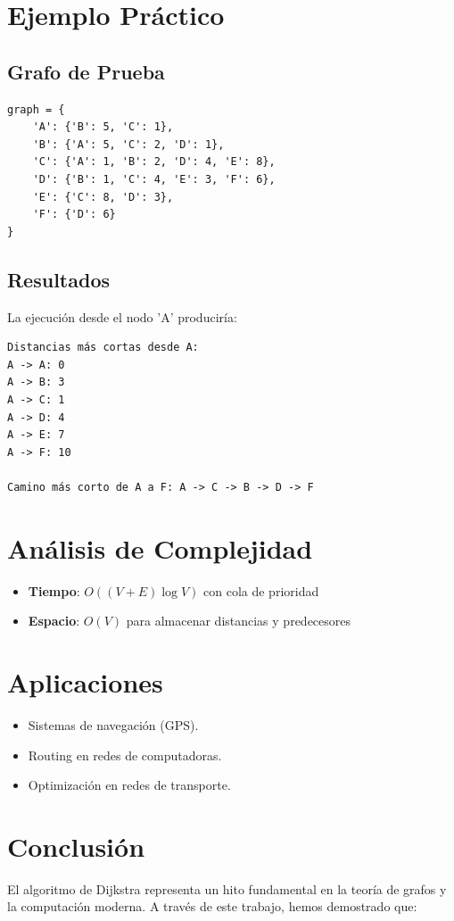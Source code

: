 \documentclass{article}
\begin{document}
\section{Ejemplo Práctico}
\subsection{Grafo de Prueba}
\begin{lstlisting}[caption=Ejemplo de Grafo]
graph = {
    'A': {'B': 5, 'C': 1},
    'B': {'A': 5, 'C': 2, 'D': 1},
    'C': {'A': 1, 'B': 2, 'D': 4, 'E': 8},
    'D': {'B': 1, 'C': 4, 'E': 3, 'F': 6},
    'E': {'C': 8, 'D': 3},
    'F': {'D': 6}
}
\end{lstlisting}

\subsection{Resultados}
La ejecución desde el nodo 'A' produciría:
\begin{verbatim}
Distancias más cortas desde A:
A -> A: 0
A -> B: 3
A -> C: 1
A -> D: 4
A -> E: 7
A -> F: 10

Camino más corto de A a F: A -> C -> B -> D -> F
\end{verbatim}

\section{Análisis de Complejidad}
\begin{itemize}
    \item \textbf{Tiempo}: $O((V+E) \log V)$ con cola de prioridad
    \item \textbf{Espacio}: $O(V)$ para almacenar distancias y predecesores
\end{itemize}

\section{Aplicaciones}
\begin{itemize}
    \item Sistemas de navegación (GPS).
    \item Routing en redes de computadoras.
    \item Optimización en redes de transporte.
\end{itemize}

\section{Conclusión}
El algoritmo de Dijkstra representa un hito fundamental en la teoría de grafos y la computación moderna. A través de este trabajo, hemos demostrado que:
\end{document}
